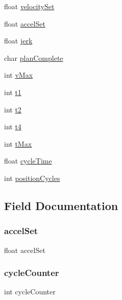 \begin{DoxyCompactItemize}
\item 
float \hyperlink{structmotion_profiler_abecf199e03d7c61b7694435888364aaf}{velocity\+Set}
\item 
float \hyperlink{structmotion_profiler_ae3f53b386932f91b87cfd744c4532603}{accel\+Set}
\item 
float \hyperlink{structmotion_profiler_ad12385a16c1e70621af252dc46ddd611}{jerk}
\item 
char \hyperlink{structmotion_profiler_a8b7b1cd195d2ce0981b7d4e85675896a}{plan\+Complete}
\item 
int \hyperlink{structmotion_profiler_a939c9510d8065a680fb9390dc98c89d9}{v\+Max}
\item 
int \hyperlink{structmotion_profiler_a1f006058637a82726360f71ab3396f0e}{t1}
\item 
int \hyperlink{structmotion_profiler_aa931d62492a0ef5a5a1ff1a2ed78d9c6}{t2}
\item 
int \hyperlink{structmotion_profiler_a3d25457e1add6ee8836d29f078e7cc1b}{t4}
\item 
int \hyperlink{structmotion_profiler_a8b70c4e6e7bfb03961f944751725e6f2}{t\+Max}
\item 
float \hyperlink{structmotion_profiler_a937382b7ba919b74e49bb7686a3b86c6}{cycle\+Time}
\item 
int \hyperlink{structmotion_profiler_a519d6d21d377d231f1c947d83de92841}{position\+Cycles}
\end{DoxyCompactItemize}


\subsection{Field Documentation}
\mbox{\label{structmotion_profiler_ae3f53b386932f91b87cfd744c4532603}} 
\subsubsection{\texorpdfstring{accel\+Set}{accelSet}}
{\footnotesize\ttfamily float accel\+Set}

\mbox{\label{structmotion_profiler_a7568fe510550cda7e14714cb1940ca8f}} 
\subsubsection{\texorpdfstring{cycle\+Counter}{cycleCounter}}
{\footnotesize\ttfamily int cycle\+Counter}

